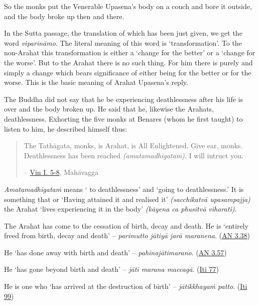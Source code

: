 So the monks put the Venerable Upasena's body on a couch and bore it outside, and the body broke up then and there.

In the Sutta passage, the translation of which has been just given, we get the word \emph{viparināmo}. The literal meaning of this word is `transformation'. To the non-Arahat this transformation is either a `change for the better' or a `change for the worse'. But to the Arahat there is no such thing. For him there is purely and simply a change which bears  significance of either being for the better or for the worse. This is the basic meaning of Arahat Upasena's reply.

The Buddha did not say that he  be experiencing deathlessness after his life is over and the body broken up. He said that he, likewise the Arahats,  deathlessness. Exhorting the five monks at Benares (whom he first taught) to listen to him, he described himself thus:

\begin{quote}
The Tathāgata, monks, is Arahat, is All Enlightened. Give ear, monks. Deathlessness has been reached \emph{(amatamadhigataṁ)}. I will intruct you.

 -- \href{https://suttacentral.net/pli-tv-kd1/en/brahmali}{Vin I. 5-8}, Mahāvagga
\end{quote}

\emph{Amatamadhigataṁ} means ` to deathlessness' and  `going to deathlessness.' It is something that  or  `Having attained it and realised it' \emph{(sacchikatvā upasampajja)} the Arahat `lives experiencing it in the body' \emph{(kāyena ca phusitvā viharati)}.

The Arahat has come to the cessation of birth, decay and death. He is `entirely freed from birth, decay and death' -- \emph{parimutto jātiyā jarā maranena}. (\href{https://suttacentral.net/an3.38/en/bodhi}{AN 3.38})

He `has done away with birth and death' -- \emph{pahīnajātimarano}. (\href{https://suttacentral.net/an3.57/en/bodhi}{AN 3.57})

He `has gone beyond birth and death' -- \emph{jāti marana maccagā}. (\href{https://suttacentral.net/iti77/en/sujato}{Iti 77})

He is one who `has arrived at the destruction of birth' -- \emph{jātikkhayaṁ patto}. (\href{https://suttacentral.net/iti99/en/sujato}{Iti 99})

